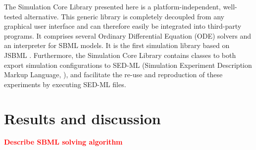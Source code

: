 \documentclass[10pt]{bmc_article}
\newenvironment{bmcformat}{\baselineskip20pt\sloppy\setboolean{publ}{false}}{\baselineskip20pt\sloppy}
\newcommand{\TODO}[1]{\textcolor{red}{\textbf{#1}}}
\begin{document}
\begin{bmcformat}
%
%
%
%
The Simulation Core Library presented here is a platform-independent,
well-tested alternative.
This generic library is completely decoupled from any graphical user interface
and can therefore easily be integrated into third-party programs.
It comprises several Ordinary Differential Equation (ODE)
solvers and an interpreter for SBML models. It is the first simulation library
based on JSBML \cite{Draeger2011b}. 
%
%
Furthermore, the Simulation Core Library contains classes to both export
simulation configurations to SED-ML (Simulation Experiment Description Markup Language,
\cite{Waltemath2011}), and facilitate the re-use and reproduction of these
experiments by executing SED-ML files.

\section{Results and discussion}

\TODO{Describe SBML solving algorithm}


\end{bmcformat}
\end{document}

